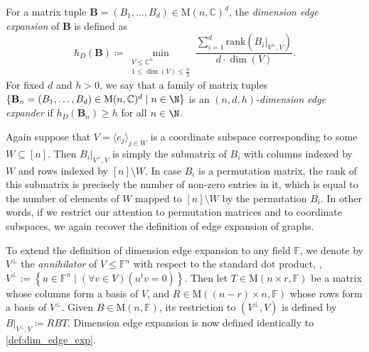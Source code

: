 \documentclass{toc}
\theoremstyle{plain}
\numberwithin{equation}{section}
\theoremstyle{definition}
\newcommand{\F}{\mathbb{F}}
\newcommand{\bC}{\mathbb{C}}
\newcommand{\rk}{\mathrm{rank}}
\newcommand{\M}{\mathrm{M}}
\newcommand{\tuple}[1]{\mathbf{#1}}
\newcommand{\vB}{\tuple{B}}
\begin{document}
\begin{definition}\label{def:dim_edge_exp}
For a matrix tuple $\vB=(B_1, \dots, B_d)\in\M(n, \bC)^d$, the \emph{dimension edge expansion} of $\vB$ is defined as
\begin{equation}\label{eq: dim edge expansion}
    h_D(\vB)\coloneqq\min_{\substack{V \leq \bC^n\\
            1\leq\dim(V)\leq \frac n2}}\frac{\sum_{i=1}^d\rk(B_i|_{V^\perp, V})}{d\cdot\dim(V)}.
\end{equation}
For fixed $d$ and $h>0$, we say that a family of matrix tuples $\{\vB_n=(B_1, \dots, B_d)\in \M(n, \bC)^d\mid n\in \N\}$ is an \emph{$(n,d,h)$-dimension edge expander} if $h_D(\vB_n)\geq h$ for all $n\in\N$. 
\end{definition}
Again suppose that $V=\langle e_j\rangle_{j \in W}$ is a coordinate subspace corresponding to some $W \subseteq [n]$.
Then $B_i|_{V^\perp,V}$ is simply the submatrix of $B_i$ with columns indexed by $W$ and rows indexed by $[n] \setminus W$. In case $B_i$ is a permutation matrix, the rank of this submatrix is precisely the number of non-zero entries in it, which is equal to the number of elements of $W$ mapped to $[n] \setminus W$ by the permutation $B_i$. In other words, if we restrict our attention to permutation matrices and to coordinate subspaces, we again recover the definition of edge expansion of graphs.

\begin{remark}\label{rmk:def-annihilator}
  To extend the definition of dimension edge expansion to any field $\F$, we denote by $V^\perp$ the \emph{annihilator} of $V\leq \F^n$ with respect to the standard dot product, 
%
\ie,     %
%
$V^{\perp}:=\left\{u \in\mathbb{F}^n \mid (\forall v\in V)(u^t v=0)\right\}$. %
Then let $T\in \M(n\times r, \F)$ be a matrix whose columns form a basis of $V$, and $R\in \M((n-r)\times n, \F)$ whose rows form a basis of $V^\perp$. Given $B \in \M(n,\F)$, its restriction to $(V^\perp, V)$ is defined by $B|_{V^\perp, V}\coloneqq RBT$. Dimension edge expansion is now defined identically to \cref{def:dim_edge_exp}.
\end{remark}
\end{document}
